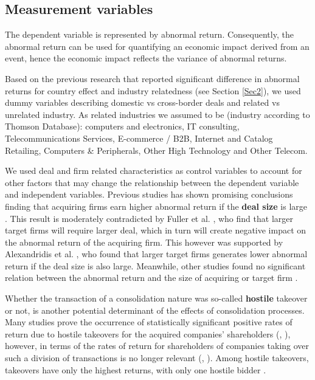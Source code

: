 \subsection{Measurement variables}

The dependent variable is represented by abnormal return. Consequently, the abnormal return can be used for quantifying an economic impact derived from an event, hence the economic impact reflects the variance of abnormal returns.

Based on the previous research that reported significant difference in abnormal returns for country effect and industry relatedness (see Section \ref{Sec2}), we used dummy variables describing domestic vs cross-border deals and related vs unrelated industry. As related industries we assumed to be (industry according to Thomson Database): computers and electronics, IT consulting, Telecommunications Services, E-commerce / B2B, Internet and Catalog Retailing, Computers \& Peripherals, Other High Technology and Other Telecom.

We used deal and firm related characteristics \cite{Cai2011} as control variables to account for other factors that may change the relationship between the dependent variable and independent variables.  Previous studies has shown promising conclusions finding that acquiring firms earn higher abnormal return if the \textbf{deal size} is large \cite{ALEXANDRIDIS2017}. This result is moderately contradicted by Fuller et al. \cite{fuller2002}, who find that larger target firms will require larger deal, which in turn will create negative impact on the abnormal return of the acquiring firm. This however was supported by Alexandridis et al. \cite{ALEXANDRIDIS20131}, who found that larger target firms generates lower abnormal return if the deal size is also large. Meanwhile, other studies found no significant relation between the abnormal return and the size of acquiring or target firm \cite{CAKICI1996307} .

Whether the transaction of a consolidation nature was so-called \textbf{hostile} takeover or not, is another potential determinant of the effects of consolidation processes. Many studies prove the occurrence of statistically significant positive rates of return due to hostile takeovers for the acquired companies' shareholders (\cite{Lounghran1997}, \cite{Rau1998}), however, in terms of the rates of return for shareholders of companies taking over such a division of transactions is no longer relevant (\cite{FRANKS1996163}, \cite{kini2004}). Among hostile takeovers, takeovers have only the highest returns, with only one hostile bidder \cite{sundersanam2006}.


